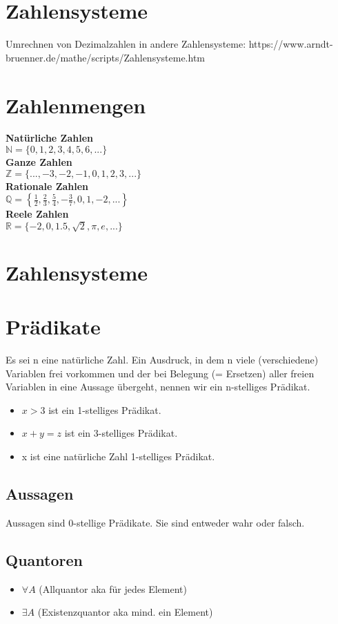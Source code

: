 \section{Zahlensysteme}

Umrechnen von Dezimalzahlen in andere Zahlensysteme:
https://www.arndt-bruenner.de/mathe/scripts/Zahlensysteme.htm

\section{Zahlenmengen}
{\bf Natürliche Zahlen}\\
\(\mathbb{N} = \{0,1,2,3,4,5,6,...\}\) \\
{\bf Ganze Zahlen}\\
\(\mathbb{Z} = \{...,-3,-2,-1,0,1,2,3,...\}\) \\
{\bf Rationale Zahlen}\\
\(\mathbb{Q} = \left\{ \frac{1}{2}, \frac{2}{3}, \frac{5}{4}, -\frac{3}{7}, 0, 1, -2, ... \right\}\) \\
{\bf Reele Zahlen}\\
\(\mathbb{R} = \{ -2, 0, 1.5, \sqrt{2}, \pi, e, ... \}\)

\section{Zahlensysteme}

\section{Prädikate}
Es sei n eine natürliche Zahl. Ein Ausdruck, in dem n viele
(verschiedene) Variablen frei vorkommen und der bei Belegung (=
Ersetzen) aller freien Variablen in eine Aussage übergeht, nennen wir
ein n-stelliges Prädikat.
\begin{itemize}
    \item $x > 3$ ist ein 1-stelliges Prädikat.
    \item $x + y = z$ ist ein 3-stelliges Prädikat.
    \item x ist eine natürliche Zahl 1-stelliges Prädikat.
\end{itemize}
\subsection{Aussagen}
Aussagen sind 0-stellige Prädikate. Sie sind entweder wahr oder falsch.
\subsection{Quantoren}
\begin{itemize}
    \item \(\forall A\) (Allquantor aka für jedes Element)
    \item \(\exists A\) (Existenzquantor aka mind. ein Element)
\end{itemize}
